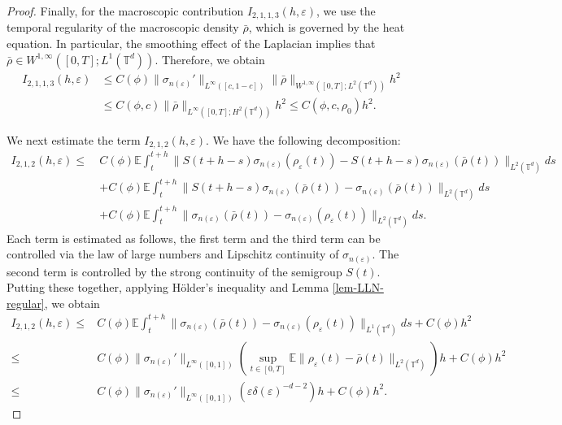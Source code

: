 \documentclass[UTF-8,reqno]{amsart}
\numberwithin{equation}{section}
\def\leq{\leqslant}
\def\leq{\leqslant}
\begin{document}
\begin{proof}
Finally, for the macroscopic contribution $I_{2,1,1,3}(h,\varepsilon)$, we use the temporal regularity of the macroscopic density $\bar{\rho}$, which is governed by the heat equation. In particular, the smoothing effect of the Laplacian implies that $\bar{\rho} \in W^{1,\infty}([0,T]; L^1(\mathbb{T}^d))$. Therefore, we obtain
\begin{align*}
I_{2,1,1,3}(h,\varepsilon) 
&\leq C(\phi) \| \sigma_{n(\varepsilon)}' \|_{L^{\infty}([c,1-c])} 
\| \bar{\rho} \|_{W^{1,\infty}([0,T]; L^2(\mathbb{T}^d))} h^2 \\
&\leq C(\phi, c) \| \bar{\rho} \|_{L^{\infty}([0,T]; H^2(\mathbb{T}^d))} h^2 
\leq C(\phi, c, \rho_0) h^2.
\end{align*}




We next estimate the term $I_{2,1,2}(h,\varepsilon)$. We have the following decomposition: 
\begin{align*}
I_{2,1,2}(h,\varepsilon)
\leq\ & C(\phi) \mathbb{E} \int_t^{t+h} \| S(t+h-s)\sigma_{n(\varepsilon)}(\rho_{\varepsilon}(t)) - S(t+h-s)\sigma_{n(\varepsilon)}(\bar{\rho}(t)) \|_{L^2(\mathbb{T}^d)} ds \\
&+ C(\phi) \mathbb{E} \int_t^{t+h} \| S(t+h-s)\sigma_{n(\varepsilon)}(\bar{\rho}(t)) - \sigma_{n(\varepsilon)}(\bar{\rho}(t)) \|_{L^2(\mathbb{T}^d)} ds\\
&+C(\phi)\mathbb{E}\int^{t+h}_t\|\sigma_{n(\varepsilon)}(\bar{\rho}(t))-\sigma_{n(\varepsilon)}(\rho_{\varepsilon}(t))\|_{L^2(\mathbb{T}^d)}ds. 
\end{align*}
Each term is estimated as follows, the first term and the third term can be controlled via the law of large numbers and Lipschitz continuity of $ \sigma_{n(\varepsilon)} $. The second term is controlled by the strong continuity of the semigroup $ S(t) $. Putting these together, applying H\"older's inequality and Lemma \ref{lem-LLN-regular}, we obtain
\begin{align*}
I_{2,1,2}(h,\varepsilon)\leq&C(\phi)\mathbb{E}\int^{t+h}_t\| \sigma_{n(\varepsilon)}(\bar{\rho}(t)) - \sigma_{n(\varepsilon)}(\rho_{\varepsilon}(t)) \|_{L^1(\mathbb{T}^d)} ds+C(\phi) h^2\\
\leq&C(\phi) \|\sigma_{n(\varepsilon)}'\|_{L^{\infty}([0,1])}(\sup_{t\in[0,T]}\mathbb{E}\|\rho_{\varepsilon}(t)-\bar{\rho}(t)\|_{L^2(\mathbb{T}^d)})h+C(\phi) h^2\\
\leq& C(\phi) \|\sigma_{n(\varepsilon)}'\|_{L^{\infty}([0,1])} 
\left( \varepsilon \delta(\varepsilon)^{-d-2} \right) h 
+ C(\phi) h^2.
\end{align*}


\end{proof}
\end{document}
